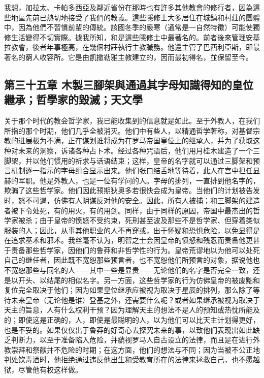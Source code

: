 我想，加拉太、卡帕多西亞及鄰近省份在那時也有許多其他教會的修行者，因為這些地區先前已熱切地接受了我們的教義。這些隱修士大多居住在城鎮和村莊的團體中，因為他們不習慣前輩的傳統。該國冬季的嚴寒（通常是一自然特徵）可能使獨修生活變得不切實際。據我所知，和是這些隱修士中最著名的。前者後來管理安基拉教會，後者年事極高，在幾個村莊執行主教職務。他還主管了巴西利亞斯，即最著名的窮人收容所。它是由凱撒勒雅主教建立的，因而最初得名，並保留至今。\par


\subsection{第三十五章 木製三腳架與通過其字母知識得知的皇位繼承；哲學家的毀滅；天文學}

关于那个时代的教会哲学家，我已能收集到的信息就是如此。至于外教人，在我们所指的那个时期，他们几乎全被消灭。他们中有些人，以精通哲学著称，对基督宗教的进展极为不满，正在谋划谁将成为在罗马帝国皇位上的继承人，并为了获取这种对未来的洞察，诉诸各种占卜术。经过各种咒语后，他们用月桂木建造了一个三脚架，并以他们惯用的祈求与话语结束；这样，皇帝的名字就可以通过三脚架和预言机制逐一指示的字母组合显示出来。他们张口结舌地等待着，此人在宫中担任显赫的军职。他是外教人，也是一位有学问的人。字母的排列，一直排到他名字的，欺骗了这些哲学家。他们因此预期狄奥多若很快会成为皇帝。当他们的计划被告发时，怒不可遏，仿佛有人阴谋反对他的安全。因此，所有人被捕；和三脚架的建造者被下令处死，有的用火，有的用剑。同样，由于同样的原因，帝国中最杰出的哲学家被杀；由于皇帝的愤怒不受约束，死刑甚至波及那些不是哲学家、但穿着类似服装的人；因此，从事其他职业的人不再穿或，出于怀疑和恐惧危险，以免显得是在追求巫术和邪术。我丝毫不认为，明智之士会因皇帝的愤怒和残忍而责备他更甚于责备那些哲学家，因他们的鲁莽和非哲学性的行为。皇帝荒谬地以为他可以处死自己的继任者，因此既不宽恕那些预言者，也不宽恕他们所预言的对象，据说他也不宽恕那些与同名的人——其中一些是显贵——无论他们的名字是否完全一致，还是以开头、以结尾的相似名字。另一方面，这些哲学家的行为仿佛皇帝的被废黜和复位完全取决于他们；因为如果皇位继承应被视为取决于星辰的排列，那么除了等待未来皇帝（无论他是谁）登基之外，还需要什么呢？或者如果继承被视为取决于天主的旨意，人有什么权利干预？因为理解天主的想法不是人的预知或热忱所能及的；即使这是正确的，人，即使是最聪明的人，以为他们可以比天主计划得更好，也是不妥的。如果仅仅出于鲁莽的好奇心去探究未来的事，以致他们表现出如此缺乏判断力，以至于准备陷入危险，并藐视罗马人自古设立的法律，而且是在进行外教崇拜和祭献并不危险的时期；在这方面，他们的想法与不同；因为当被不公正地判处饮毒酒时，他拒绝通过违反他出生和受教育所在的法律来拯救自己，也不愿越狱，尽管他有权这样做。\par

